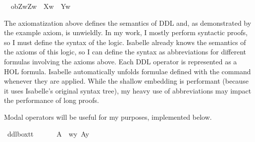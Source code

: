 \begin{isabellebody}
\ \ {\isasymlongrightarrow}ob{\isacharparenleft}Z{\isacharparenright}{\isacharparenleft}{\isasymlambda}w{\isachardot}{\isacharparenleft}Z{\isacharparenleft}w{\isacharparenright}\ {\isasymand}\ {\isasymnot}X{\isacharparenleft}w{\isacharparenright}{\isacharparenright}\ {\isasymor}\ Y{\isacharparenleft}w{\isacharparenright}{\isacharparenright}{\isachardoublequoteclose}\isanewline
%
\isanewline
%
\isadelimdocument
%
\endisadelimdocument
%
\isatagdocument
%
\isamarkuptrue%
%
\endisatagdocument
{\isafolddocument}%
%
\isadelimdocument
%
\endisadelimdocument
%
\begin{isamarkuptext}%
The axiomatization above defines the semantics of DDL and, as demonstrated by the example axiom,
is unwieldly. In my work, I mostly perform syntactic proofs, so I must define the syntax of the logic.
Isabelle already knows the semantics of the axioms of this logic, so I can define the syntax as abbreviations for different
formulas involving the axioms above. Each DDL operator is represented
as a HOL formula. Isabelle automatically unfolds formulae defined with the  command 
whenever they are applied. While the shallow embedding is performant (because it uses Isabelle's original 
syntax tree), my heavy use of abbreviations may impact the performance of long proofs.%
\end{isamarkuptext}\isamarkuptrue%
%
\begin{isamarkuptext}%
Modal operators will be useful for my purposes, implemented below.%
\end{isamarkuptext}\isamarkuptrue%
\isamarkupfalse%
\ ddlbox{\isacharcolon}{\isacharcolon}{\isachardoublequoteopen}t{\isasymRightarrow}t{\isachardoublequoteclose}\ {\isacharparenleft}{\isachardoublequoteopen}{\isasymbox}{\isachardoublequoteclose}{\isacharparenright}\ \isanewline
\ \ \ {\isachardoublequoteopen}{\isasymbox}\ A\ {\isasymequiv}\ {\isasymlambda}w{\isachardot}{\isasymforall}y{\isachardot}\ A{\isacharparenleft}y{\isacharparenright}{\isachardoublequoteclose}\ \isanewline
%
\end{isabellebody}
